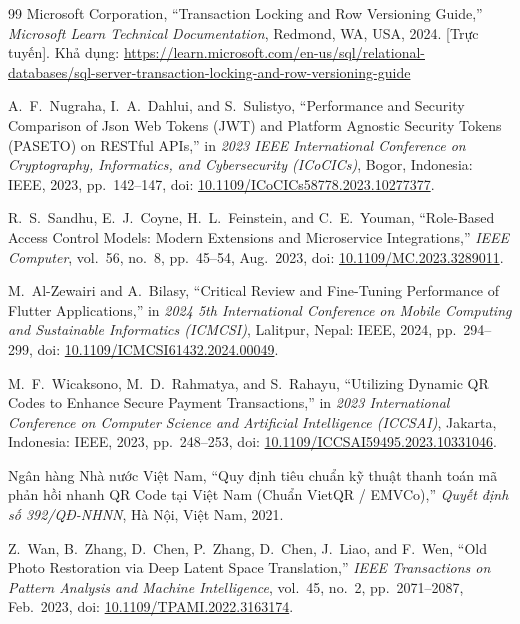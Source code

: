 \begin{thebibliography}{99}
Microsoft Corporation, ``Transaction Locking and Row Versioning Guide,'' \textit{Microsoft Learn Technical Documentation}, Redmond, WA, USA, 2024. [Trực tuyến]. Khả dụng: \url{https://learn.microsoft.com/en-us/sql/relational-databases/sql-server-transaction-locking-and-row-versioning-guide}

A.~F.~Nugraha, I.~A.~Dahlui, and S.~Sulistyo, ``Performance and Security Comparison of Json Web Tokens (JWT) and Platform Agnostic Security Tokens (PASETO) on RESTful APIs,'' in \textit{2023 IEEE International Conference on Cryptography, Informatics, and Cybersecurity (ICoCICs)}, Bogor, Indonesia: IEEE, 2023, pp.~142--147, doi: \href{https://doi.org/10.1109/ICoCICs58778.2023.10277377}{10.1109/ICoCICs58778.2023.10277377}.

R.~S.~Sandhu, E.~J.~Coyne, H.~L.~Feinstein, and C.~E.~Youman, ``Role-Based Access Control Models: Modern Extensions and Microservice Integrations,'' \textit{IEEE Computer}, vol.~56, no.~8, pp.~45--54, Aug.~2023, doi: \href{https://doi.org/10.1109/MC.2023.3289011}{10.1109/MC.2023.3289011}.

M.~Al-Zewairi and A.~Bilasy, ``Critical Review and Fine-Tuning Performance of Flutter Applications,'' in \textit{2024 5th International Conference on Mobile Computing and Sustainable Informatics (ICMCSI)}, Lalitpur, Nepal: IEEE, 2024, pp.~294--299, doi: \href{https://doi.org/10.1109/ICMCSI61432.2024.00049}{10.1109/ICMCSI61432.2024.00049}.

M.~F.~Wicaksono, M.~D.~Rahmatya, and S.~Rahayu, ``Utilizing Dynamic QR Codes to Enhance Secure Payment Transactions,'' in \textit{2023 International Conference on Computer Science and Artificial Intelligence (ICCSAI)}, Jakarta, Indonesia: IEEE, 2023, pp.~248--253, doi: \href{https://doi.org/10.1109/ICCSAI59495.2023.10331046}{10.1109/ICCSAI59495.2023.10331046}.

Ngân hàng Nhà nước Việt Nam, ``Quy định tiêu chuẩn kỹ thuật thanh toán mã phản hồi nhanh QR Code tại Việt Nam (Chuẩn VietQR / EMVCo),'' \textit{Quyết định số 392/QĐ-NHNN}, Hà Nội, Việt Nam, 2021.

Z.~Wan, B.~Zhang, D.~Chen, P.~Zhang, D.~Chen, J.~Liao, and F.~Wen, ``Old Photo Restoration via Deep Latent Space Translation,'' \textit{IEEE Transactions on Pattern Analysis and Machine Intelligence}, vol.~45, no.~2, pp.~2071--2087, Feb.~2023, doi: \href{https://doi.org/10.1109/TPAMI.2022.3163174}{10.1109/TPAMI.2022.3163174}.


\end{thebibliography}
